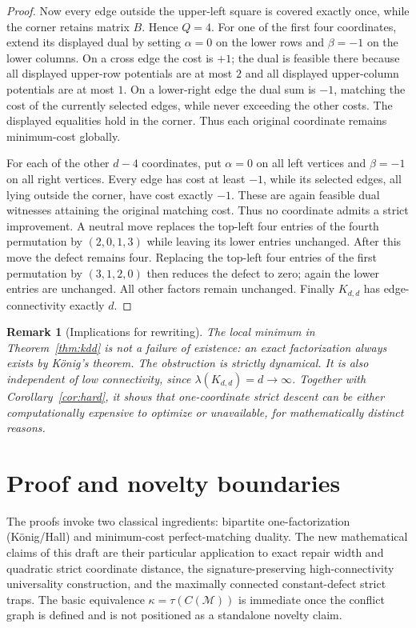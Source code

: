 \documentclass[10pt]{article}
\newtheorem{remark}[theorem]{Remark}
\newcommand{\M}{\mathcal M}
\begin{document}
\begin{proof}
Now every edge outside the upper-left square is covered exactly once, while the corner retains matrix $B$. Hence $Q=4$. For one of the first four coordinates, extend its displayed dual by setting $\alpha=0$ on the lower rows and $\beta=-1$ on the lower columns. On a cross edge the cost is $+1$; the dual is feasible there because all displayed upper-row potentials are at most $2$ and all displayed upper-column potentials are at most $1$. On a lower-right edge the dual sum is $-1$, matching the cost of the currently selected edges, while never exceeding the other costs. The displayed equalities hold in the corner. Thus each original coordinate remains minimum-cost globally.

For each of the other $d-4$ coordinates, put $\alpha=0$ on all left vertices and $\beta=-1$ on all right vertices. Every edge has cost at least $-1$, while its selected edges, all lying outside the corner, have cost exactly $-1$. These are again feasible dual witnesses attaining the original matching cost. Thus no coordinate admits a strict improvement. A neutral move replaces the top-left four entries of the fourth permutation by $(2,0,1,3)$ while leaving its lower entries unchanged. After this move the defect remains four. Replacing the top-left four entries of the first permutation by $(3,1,2,0)$ then reduces the defect to zero; again the lower entries are unchanged. All other factors remain unchanged. Finally $K_{d,d}$ has edge-connectivity exactly $d$.
\end{proof}

\begin{remark}[Implications for rewriting]
The local minimum in Theorem~\ref{thm:kdd} is not a failure of existence: an exact factorization always exists by König's theorem. The obstruction is strictly dynamical. It is also independent of low connectivity, since $\lambda(K_{d,d})=d\to\infty$. Together with Corollary~\ref{cor:hard}, it shows that one-coordinate strict descent can be either \emph{computationally expensive to optimize} or \emph{unavailable}, for mathematically distinct reasons.
\end{remark}

\section{Proof and novelty boundaries}
The proofs invoke two classical ingredients: bipartite one-factorization (König/Hall) and minimum-cost perfect-matching duality. The new mathematical claims of this draft are their particular application to exact repair width and quadratic strict coordinate distance, the signature-preserving high-connectivity universality construction, and the maximally connected constant-defect strict traps. The basic equivalence $\kappa=\tau(C(\M))$ is immediate once the conflict graph is defined and is not positioned as a standalone novelty claim.
\end{document}
